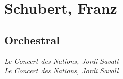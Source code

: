 \chapter{Schubert, Franz} %
\label{cha:schubert}

\section{Orchestral}

 \textit{Le Concert des Nations, Jordi Savall} \\
 \textit{Le Concert des Nations, Jordi Savall} \\
